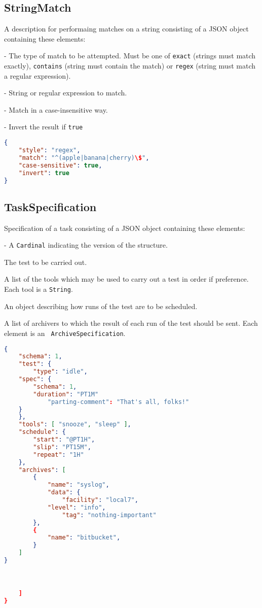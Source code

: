 \documentclass[10pt]{article}
\begin{document}
\subsection{StringMatch}
A description for performaing matches on a string consisting of a JSON
object containing these elements:

 - The type of match to be attempted.  Must
be one of {\tt exact} (strings must match exactly), {\tt contains}
(string must contain the match) or {\tt regex} (string must match a
regular expression).

 - String or regular expression to match.

 - Match in a case-insensitive
way.

 - Invert the result if {\tt true}

\example
\begin{lstlisting}[language=json]
{
    "style": "regex",
    "match": "^(apple|banana|cherry)\$",
    "case-sensitive": true,
    "invert": true
}
\end{lstlisting}



\subsection{TaskSpecification}
Specification of a task consisting of a JSON object containing these
elements:

 - A {\tt Cardinal} indicating the version
of the structure.

 The test to be carried out.

 A list of the tools which may be used to
carry out a test in order if preference.  Each tool is a {\tt String}.

 An object describing how
runs of the test are to be scheduled.

 A list of archivers to which the result of
each run of the test should be sent.  Each element is an {\tt
  ArchiveSpecification}.

\example
\begin{lstlisting}[language=json]
{
    "schema": 1,
    "test": {
        "type": "idle",
	"spec": {
	    "schema": 1,
	    "duration": "PT1M"
            "parting-comment": "That's all, folks!"
	}
    },
    "tools": [ "snooze", "sleep" ],
    "schedule": {
        "start": "@PT1H",
        "slip": "PT15M",
        "repeat": "1H"
    },
    "archives": [
        {
            "name": "syslog",
            "data": {
                "facility": "local7",
        	"level": "info",
                "tag": "nothing-important"
        },
        {
            "name": "bitbucket",
        }
    ]
}



    ]
}
\end{lstlisting}
\end{document}
